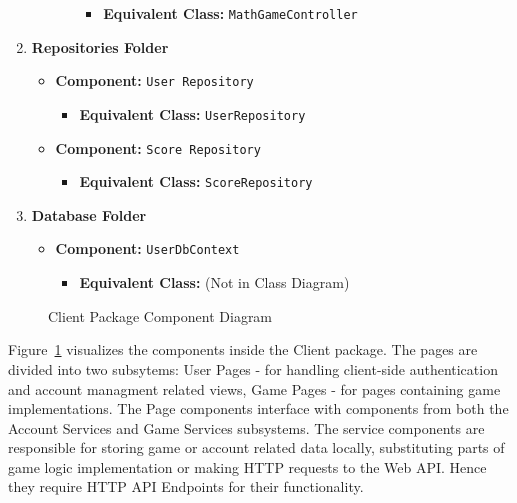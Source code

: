 \documentclass[11pt,a4paper]{article}
\newcommand{\inputdiagram}[1]{}
\begin{document}
\begin{enumerate}[label=\textbf{\arabic*.}, ref=\arabic*]
\begin{enumerate}[label=\textbf{\alph*.}, ref=\theenumi.\alph*]
\begin{itemize}
                        \begin{itemize}
                            \item \textbf{Equivalent Class:} \texttt{MathGameController}
                        \end{itemize}
                \end{itemize}
        \end{enumerate}
    \item \textbf{Repositories Folder}
        \begin{itemize}
            \item \textbf{Component:} \texttt{User Repository}
                \begin{itemize}
                    \item \textbf{Equivalent Class:} \texttt{UserRepository}
                \end{itemize}
            \item \textbf{Component:} \texttt{Score Repository}
                \begin{itemize}
                    \item \textbf{Equivalent Class:} \texttt{ScoreRepository}
                \end{itemize}
        \end{itemize}
    \item \textbf{Database Folder}
        \begin{itemize}
            \item \textbf{Component:} \texttt{UserDbContext}
                \begin{itemize}
                    \item \textbf{Equivalent Class:} (Not in Class Diagram)
                \end{itemize}
        \end{itemize}
\end{enumerate}

\begin{figure}[H]
    \centering
     \begin{adjustbox}{width=0.92\paperwidth,center}
         \inputdiagram{client_components.tex}
     \end{adjustbox}
    \caption{Client Package Component Diagram}
    \label{fig:client_components}
\end{figure}

Figure~\ref{fig:client_components} visualizes the components inside the Client package.  The pages
are divided into two subsytems: User Pages - for handling client-side
authentication and account managment related views, Game Pages - for pages
containing game implementations. The Page components interface with components
from both the Account Services and Game Services subsystems.  The service
components are responsible for storing game or account related data locally,
substituting parts of game logic implementation or making HTTP requests to
the Web API. Hence they require HTTP API Endpoints for their functionality.
\end{document}
